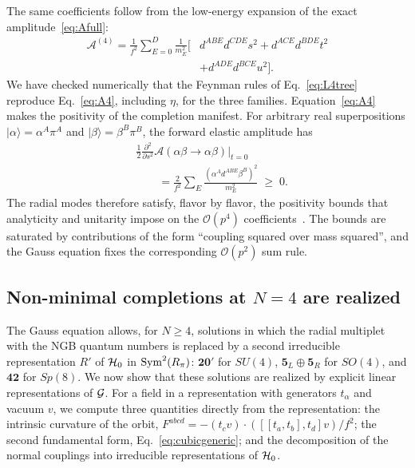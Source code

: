 The same coefficients follow from the low-energy expansion of the exact amplitude~\eqref{eq:Afull}:
\begin{equation}
\begin{split}
\mathcal A^{(4)}=\frac{1}{f^2}\sum_{E=0}^{D}\frac{1}{m_E^2}\Big[&d^{ABE}d^{CDE}s^2+d^{ACE}d^{BDE}t^2\\
&+d^{ADE}d^{BCE}u^2\Big].
\end{split}
\label{eq:A4}
\end{equation}
We have checked numerically that the Feynman rules of Eq.~\eqref{eq:L4tree} reproduce Eq.~\eqref{eq:A4}, including $\eta$, for the three families. Equation~\eqref{eq:A4} makes the positivity of the completion manifest. For arbitrary real superpositions $|\alpha\rangle=\alpha^A\pi^A$ and $|\beta\rangle=\beta^B\pi^B$, the forward elastic amplitude has
\begin{equation}
\begin{split}
&\frac{1}{2}\frac{\partial^2}{\partial s^2}\mathcal A(\alpha\beta\to\alpha\beta)\Big|_{t=0}\\
&\qquad=\frac{2}{f^2}\sum_E\frac{(\alpha^Ad^{ABE}\beta^B)^2}{m_E^2}\;\ge\;0 .
\end{split}
\end{equation}
The radial modes therefore satisfy, flavor by flavor, the positivity bounds that analyticity and unitarity impose on the $\mathcal O(p^4)$ coefficients~\cite{Adams:2006sv,Manohar:2008tc}. The bounds are saturated by contributions of the form ``coupling squared over mass squared'', and the Gauss equation fixes the corresponding $\mathcal O(p^2)$ sum rule.

\subsection{Non-minimal completions at $N=4$ are realized}
\label{add:N4}

The Gauss equation allows, for $N\ge4$, solutions in which the radial multiplet with the NGB quantum numbers is replaced by a second irreducible representation $R'$ of $\mathcal{H}_0$ in ${\rm Sym}^2(R_\pi)$: $\mathbf{20}'$ for $SU(4)$, $\mathbf 5_L\oplus\mathbf 5_R$ for $SO(4)$, and $\mathbf{42}$ for $Sp(8)$. We now show that these solutions are realized by explicit linear representations of $\mathcal{G}$. For a field in a representation with generators $t_\alpha$ and vacuum $v$, we compute three quantities directly from the representation: the intrinsic curvature of the orbit, $F^{abcd}=-(t_cv)\cdot([[t_a,t_b],t_d]v)/f^2$; the second fundamental form, Eq.~\eqref{eq:cubicgeneric}; and the decomposition of the normal couplings into irreducible representations of $\mathcal{H}_0$.

